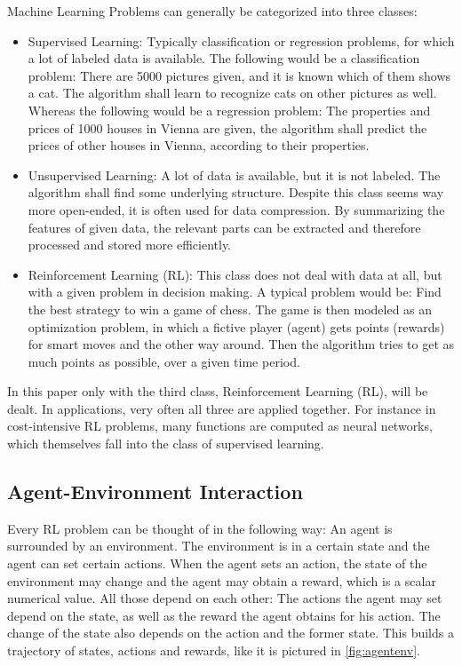 \documentclass[paper=a4, fontsize=11pt]{scrartcl} %
\numberwithin{equation}{section} %
\numberwithin{figure}{section} %
\numberwithin{table}{section} %
\begin{document}
	Machine Learning Problems can generally be categorized into three classes: 
\begin{itemize}
\item Supervised Learning: Typically classification or regression problems, for which a lot of labeled data is available. The following would be a classification problem: There are 5000 pictures given, and it is known which of them shows a cat. The algorithm shall learn to recognize cats on other pictures as well. Whereas the following would be a regression problem: The properties and prices of 1000 houses in Vienna are given, the algorithm shall predict the prices of other houses in Vienna, according to their properties. 
\item Unsupervised Learning: A lot of data is available, but it is not labeled. The algorithm shall find some underlying structure. Despite this class seems way more open-ended, it is often used for data compression. By summarizing the features of given data, the relevant parts can be extracted and therefore processed and stored more efficiently. 
\item Reinforcement Learning (RL): This class does not deal with data at all, but with a given problem in decision making. A typical problem would be: Find the best strategy to win a game of chess. The game is then modeled as an optimization problem, in which a fictive player (agent) gets points (rewards) for smart moves and the other way around. Then the algorithm tries to get as much points as possible, over a given time period.
\end{itemize}

	In this paper only with the third class, Reinforcement Learning (RL), will be dealt. In applications, very often all three are applied together. For instance in cost-intensive RL problems, many functions are computed as neural networks, which themselves fall into the class of supervised learning.

\subsection{Agent-Environment Interaction}

	Every RL problem can be thought of in the following way: An agent  is surrounded by an environment. The environment is in a certain state and the agent can set certain actions. When the agent sets an action, the state of the environment may change and the agent may obtain a reward, which is a scalar numerical value. All those depend on each other: The actions the agent may set depend on the state, as well as the reward the agent obtains for his action. The change of the state also depends on the action and the former state. This builds a trajectory of states, actions and rewards, like it is pictured in \ref{fig:agentenv}. 
\end{document}
